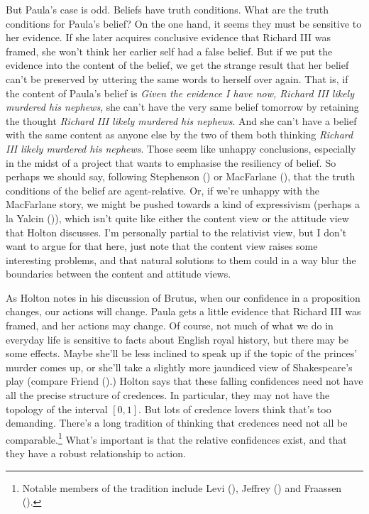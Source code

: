 \documentclass[
  11pt,
  letterpaper,
  DIV=11,
  numbers=noendperiod,
  twoside]{scrartcl}
\begin{document}
But Paula's case is odd. Beliefs have truth conditions. What are the
truth conditions for Paula's belief? On the one hand, it seems they must
be sensitive to her evidence. If she later acquires conclusive evidence
that Richard III was framed, she won't think her earlier self had a
false belief. But if we put the evidence into the content of the belief,
we get the strange result that her belief can't be preserved by uttering
the same words to herself over again. That is, if the content of Paula's
belief is \emph{Given the evidence I have now, Richard III likely
murdered his nephews}, she can't have the very same belief tomorrow by
retaining the thought \emph{Richard III likely murdered his nephews}.
And she can't have a belief with the same content as anyone else by the
two of them both thinking \emph{Richard III likely murdered his
nephews}. Those seem like unhappy conclusions, especially in the midst
of a project that wants to emphasise the resiliency of belief. So
perhaps we should say, following Stephenson
() or MacFarlane
(), that the truth conditions of the
belief are agent-relative. Or, if we're unhappy with the MacFarlane
story, we might be pushed towards a kind of expressivism (perhaps a la
Yalcin ()), which isn't quite like either
the content view or the attitude view that Holton discusses. I'm
personally partial to the relativist view, but I don't want to argue for
that here, just note that the content view raises some interesting
problems, and that natural solutions to them could in a way blur the
boundaries between the content and attitude views.

As Holton notes in his discussion of Brutus, when our confidence in a
proposition changes, our actions will change. Paula gets a little
evidence that Richard III was framed, and her actions may change. Of
course, not much of what we do in everyday life is sensitive to facts
about English royal history, but there may be some effects. Maybe she'll
be less inclined to speak up if the topic of the princes' murder comes
up, or she'll take a slightly more jaundiced view of Shakespeare's play
(compare Friend ().) Holton says that
these falling confidences need not have all the precise structure of
credences. In particular, they may not have the topology of the interval
\([0, 1]\). But lots of credence lovers think that's too demanding.
There's a long tradition of thinking that credences need not all be
comparable.\footnote{Notable members of the tradition include Levi
  (), Jeffrey
  () and Fraassen
  ().} What's important is that the
relative confidences exist, and that they have a robust relationship to
action.
\end{document}
